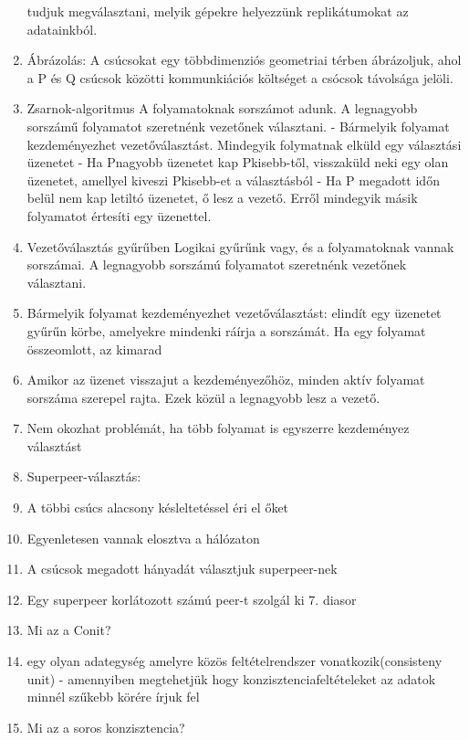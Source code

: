 \documentclass[twoside, a4paper, 12pt]{article}
\begin{document}
\begin{enumerate}
                tudjuk megválasztani, melyik gépekre helyezzünk replikátumokat az adatainkból.
            \item Ábrázolás: A csúcsokat egy többdimenziós geometriai térben ábrázoljuk, ahol a P és Q csúcsok közötti kommunkiációs költséget a csócsok távolsága jelöli.
            \item  Zsarnok-algoritmus
                A folyamatoknak sorszámot adunk. A legnagyobb sorszámű folyamatot szeretnénk vezetőnek választani.
                - Bármelyik folyamat kezdeményezhet vezetőválasztást. Mindegyik folymatnak elküld egy választási üzenetet
                - Ha Pnagyobb üzenetet kap Pkisebb-től, visszaküld neki egy olan üzenetet, amellyel kiveszi Pkisebb-et a választásból
                - Ha P megadott időn belül nem kap letiltó üzenetet, ő lesz a vezető. Erről mindegyik másik folyamatot értesíti egy üzenettel.
            \item  Vezetőválasztás gyűrűben
                Logikai gyűrűnk vagy, és a folyamatoknak vannak sorszámai. A legnagyobb sorszámú folyamatot szeretnénk vezetőnek választani.
            \item Bármelyik folyamat kezdeményezhet vezetőválasztást: elindít egy üzenetet gyűrűn körbe, amelyekre mindenki ráírja a sorszámát.
                Ha egy folyamat összeomlott, az kimarad
            \item Amikor az üzenet visszajut a kezdeményezőhöz, minden aktív folyamat sorszáma szerepel rajta. Ezek közül a legnagyobb lesz a vezető.
            \item Nem okozhat problémát, ha több folyamat is egyszerre kezdeményez választást	
            \item  Superpeer-választás:
            \item A többi csúcs alacsony késleltetéssel éri el őket
            \item Egyenletesen vannak elosztva a hálózaton
            \item A csúcsok megadott hányadát választjuk superpeer-nek
            \item Egy superpeer korlátozott számú peer-t szolgál ki
                7. diasor
            \item  Mi az a Conit?
            \item egy olyan adategység amelyre közös feltételrendszer vonatkozik(consisteny unit)
                - amennyiben megtehetjük hogy konzisztenciafeltételeket az adatok minnél szűkebb körére írjuk fel
            \item  Mi az a soros konzisztencia?

\end{enumerate}
\end{document}
